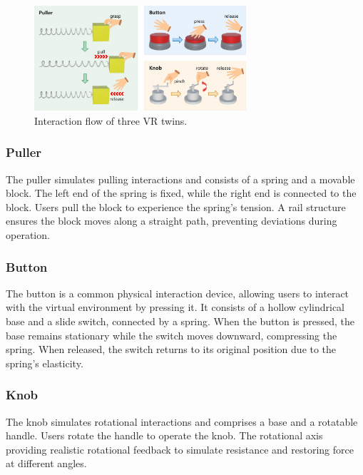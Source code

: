 \documentclass[sigconf,review,anonymous]{acmart}
\begin{document}
\begin{figure}[t]
  \centering
  \includegraphics[width=0.7\textwidth]{image/Interaction-Flow.pdf}
  \caption{Interaction flow of three VR twins.}
  \label{fig:interaction-flow}
\end{figure}

\subsubsection{Puller}
The puller simulates pulling interactions and consists of a spring and a movable block. The left end of the spring is fixed, while the right end is connected to the block. Users pull the block to experience the spring's tension. A rail structure ensures the block moves along a straight path, preventing deviations during operation.

\subsubsection{Button}
The button is a common physical interaction device, allowing users to interact with the virtual environment by pressing it. It consists of a hollow cylindrical base and a slide switch, connected by a spring. When the button is pressed, the base remains stationary while the switch moves downward, compressing the spring. When released, the switch returns to its original position due to the spring's elasticity.

\subsubsection{Knob}
The knob simulates rotational interactions and comprises a base and a rotatable handle. Users rotate the handle to operate the knob. The rotational axis providing realistic rotational feedback to simulate resistance and restoring force at different angles.
\end{document}
